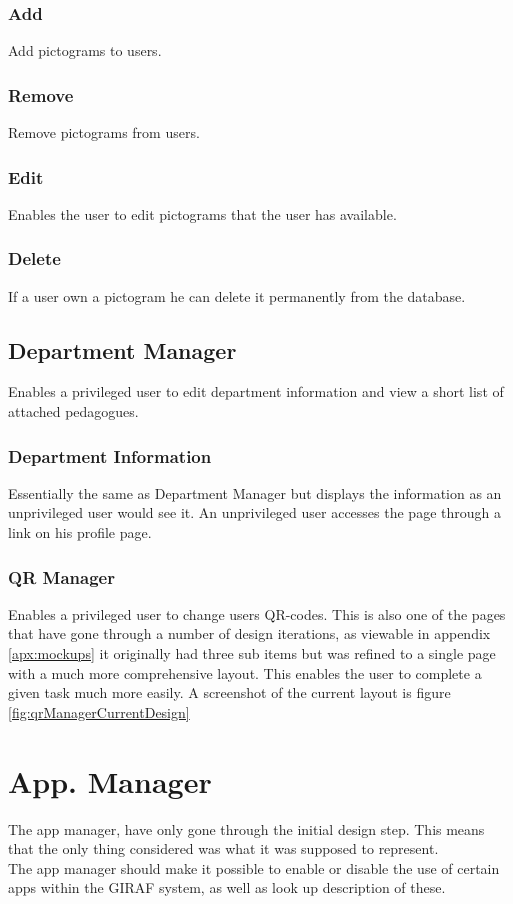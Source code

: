 \subsubsection*{Add}
Add pictograms to users.
\subsubsection*{Remove}
Remove pictograms from users.
\subsubsection*{Edit}
Enables the user to edit pictograms that the user has available.
\subsubsection*{Delete}
If a user own a pictogram he can delete it permanently from the database.

\subsection{Department Manager}
Enables a privileged user to edit department information and view a short list of attached pedagogues.
\subsubsection*{Department Information}
Essentially the same as Department Manager but displays the information as an unprivileged user would see it. An unprivileged user accesses the page through a link on his profile page.
\subsubsection*{QR Manager}
Enables a privileged user to change users QR-codes. This is also one of the pages that have gone through a number of design iterations, as viewable in appendix \ref{apx:mockups} it originally had three sub items but was refined to a single page with a much more comprehensive layout. This enables the user to complete a given task much more easily. A screenshot of the current layout is figure \ref{fig:qrManagerCurrentDesign}

\section{App. Manager}
The app manager, have only gone through the initial design step. This means that the only thing considered was what it was supposed to represent.\\
The app manager should make it possible to enable or disable the use of certain apps within the GIRAF system, as well as look up description of these.

